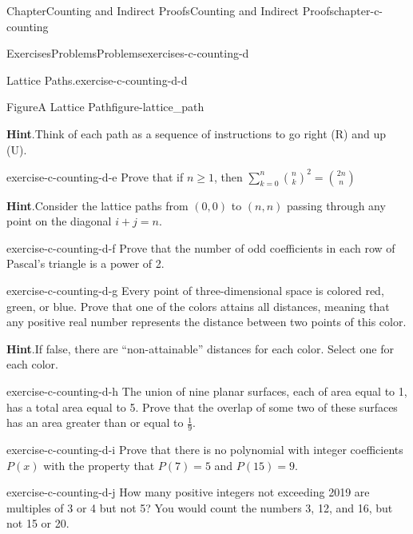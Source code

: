 \documentclass[oneside,10pt,]{book}
\newcommand{\blocktitlefont}{\relax}
\numberwithin{equation}{section}
\begin{document}
\begin{chapterptx}{Chapter}{Counting and Indirect Proofs}{}{Counting and Indirect Proofs}{}{}{chapter-c-counting}
\begin{exercises-section}{Exercises}{Problems}{}{Problems}{}{}{exercises-c-counting-d}
\begin{divisionexercise}{3}{Lattice Paths.}{}{exercise-c-counting-d-d}
\begin{figureptx}{Figure}{A Lattice Path}{figure-lattice_path}{}
\begin{image}{0.2}{0.6}{0.2}{}
\end{image}%
\tcblower
\end{figureptx}%
\par\smallskip%
\noindent\textbf{\blocktitlefont Hint}.\hypertarget{hint-c-counting-d-d-d}{}\quad{}Think of each path as a sequence of instructions to go right (R) and up (U).%
\end{divisionexercise}%
\begin{divisionexercise}{4}{}{}{exercise-c-counting-d-e}%
Prove that if \(n\geq 1\), then \(\sum _{k=0}^n \binom{n}{k}^2=\binom{2 n}{n}\)%
\par\smallskip%
\noindent\textbf{\blocktitlefont Hint}.\hypertarget{hint-c-counting-d-e-b}{}\quad{}Consider the lattice paths from \((0,0)\) to \((n,n)\) passing through any point on the diagonal \(i + j = n\).%
\end{divisionexercise}%
\begin{divisionexercise}{5}{}{}{exercise-c-counting-d-f}%
Prove that the number of odd coefficients in each row of Pascal's triangle is a power of 2.%
\end{divisionexercise}%
\begin{divisionexercise}{6}{}{}{exercise-c-counting-d-g}%
Every point of three-dimensional space is colored red, green, or blue. Prove that one of the colors attains all distances, meaning that any positive real number represents the distance between two points of this color.%
\par\smallskip%
\noindent\textbf{\blocktitlefont Hint}.\hypertarget{hint-c-counting-d-g-b}{}\quad{}If false, there are ``non-attainable'' distances for each color. Select one for each color.%
\end{divisionexercise}%
\begin{divisionexercise}{7}{}{}{exercise-c-counting-d-h}%
The union of nine planar surfaces, each of area equal to 1, has a total area equal to 5. Prove that the overlap of some two of these surfaces has an area greater than or equal to \(\frac{1}{9}\).%
\end{divisionexercise}%
\begin{divisionexercise}{8}{}{}{exercise-c-counting-d-i}%
Prove that there is no polynomial with integer coefficients \(P(x)\) with the property that \(P(7) = 5\) and \(P(15) = 9\).%
\end{divisionexercise}%
\begin{divisionexercise}{9}{}{}{exercise-c-counting-d-j}%
How many positive integers not exceeding 2019 are multiples of 3 or 4 but not 5? You would count the numbers 3, 12, and 16, but not 15 or 20.%
\end{divisionexercise}%
\end{exercises-section}
\end{chapterptx}
\end{document}
